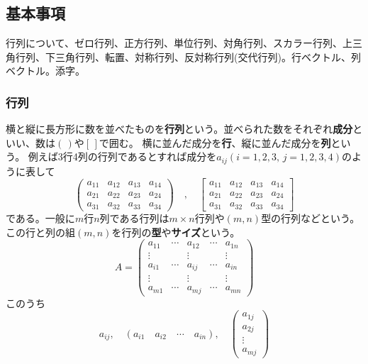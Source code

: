 \documentclass[10pt]{jsarticle}
\theoremstyle{definition}%
\numberwithin{equation}{section}%
\begin{document}
\subsection{基本事項}
行列について、ゼロ行列、正方行列、単位行列、対角行列、スカラー行列、上三角行列、下三角行列、転置、対称行列、反対称行列(交代行列)。行ベクトル、列ベクトル。添字。
\subsubsection{行列}
横と縦に長方形に数を並べたものを{\bf 行列}という。並べられた数をそれぞれ{\bf 成分}といい、数は$(\,)$や$[\,]$で囲む。
横に並んだ成分を{\bf 行}、縦に並んだ成分を{\bf 列}という。
例えば3行4列の行列であるとすれば成分を$a_{ij}(i=1,2,3,\, j=1,2,3,4)$のように表して
\begin{equation}\left(
 \begin{matrix}
    a_{11} & a_{12} & a_{13} & a_{14} \\
    a_{21} & a_{22} & a_{23} & a_{24} \\
    a_{31} & a_{32} & a_{33} & a_{34} 
  \end{matrix}\right) \quad , \quad \left[
    \begin{matrix}
      a_{11} & a_{12} & a_{13} & a_{14} \\
      a_{21} & a_{22} & a_{23} & a_{24} \\
      a_{31} & a_{32} & a_{33} & a_{34} 
    \end{matrix}\right]
\end{equation}
である。一般に$m$行$n$列である行列は$m\times n$行列や$(m,n)$型の行列などという。この行と列の組$(m,n)$を行列の{\bf 型}や{\bf サイズ}という。
\begin{equation}
  \label{gyoretu}  A=
  \left(
 \begin{matrix}
    a_{11} & \cdots & a_{12} & \cdots & a_{1n} \\
    \vdots &        & \vdots &        & \vdots \\
    a_{i1} & \cdots & a_{ij} & \cdots & a_{in}\\ 
    \vdots &        & \vdots &        & \vdots \\
    a_{m1} & \cdots & a_{mj} & \cdots & a_{mn} 
  \end{matrix}\right)
\end{equation}
このうち 
\begin{equation}
  a_{ij} , \quad (a_{i1} \quad a_{i2} \quad \cdots \quad a_{in} ),\quad  \left( \begin{matrix}
    a_{1j}\\
    a_{2j}\\
    \vdots\\
    a_{mj}
  \end{matrix}\right)
\end{equation}
\end{document}
